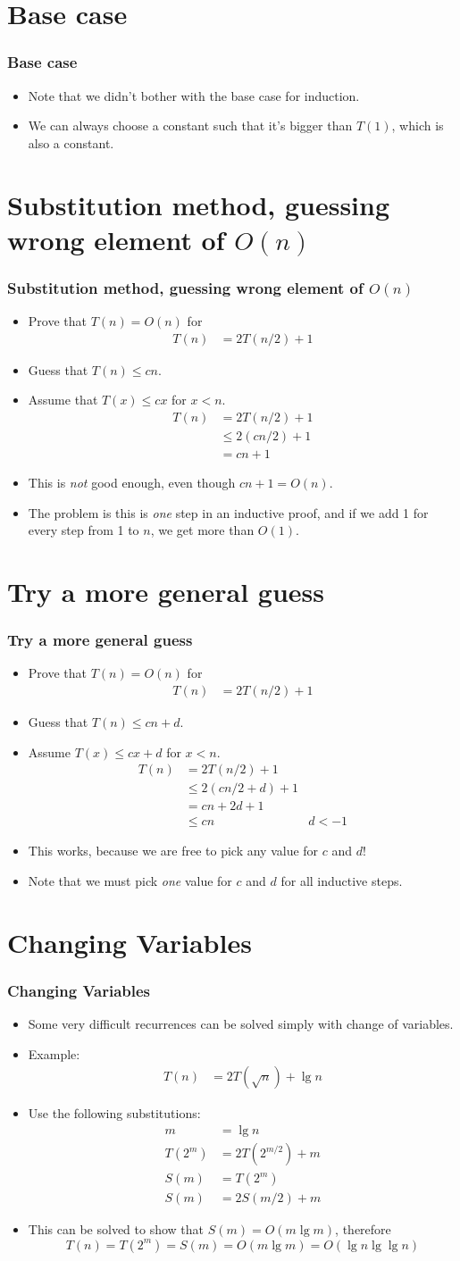 \documentclass{beamer}
\newcommand{\sect}[1]{
\section{#1}
\begin{frame}[fragile]\frametitle{#1}
}
\newcommand{\bi}{\begin{itemize}}
\newcommand{\ii}{\item}
\newcommand{\ei}{\end{itemize}}
\begin{document}
\sect{Base case}
\bi
\ii Note that we didn't bother with the base case for induction.
\ii We can always choose a constant such that it's bigger than $T(1)$,
which is also a constant.
\ei
\end{frame}

\sect{Substitution method, guessing wrong element of $O(n)$}
\bi
\ii
Prove that $T(n) = O(n)$ for
\begin{align*}
  T(n) &= 2T(n/2) + 1
\end{align*}
\ii
Guess that $T(n) \leq cn$.
\ii
Assume that $T(x) \leq cx$ for $x < n$.
\begin{align*}
  T(n) &= 2T(n/2) + 1 \\
       &\leq 2(cn/2) + 1\\
       &= cn + 1
\end{align*}
\ii
This is {\em not} good enough, even though $cn +1 = O(n)$.
\ii
The problem is this is {\em one} step in an inductive proof,
and if we add 1 for every step from 1 to $n$, we get more than $O(1)$.
\ei
\end{frame}
\sect{Try a more general guess}
\bi
\ii
Prove that $T(n) = O(n)$ for
\begin{align*}
  T(n) &= 2T(n/2) + 1
\end{align*}
\ii
Guess that $T(n) \leq cn + d$.
\ii
Assume $T(x) \leq cx + d$ for $x < n$.
\begin{align*}
  T(n) &= 2T(n/2) + 1 \\
       &\leq 2(cn/2 + d) + 1\\
       &= cn + 2d + 1\\
       &\leq cn  & d < -1
\end{align*}
\ii
This works, because we are free to pick any value for $c$ and $d$!
\ii
Note that we must pick {\em one} value for $c$ and $d$ for
all inductive steps.  
\ei
\end{frame}

\sect{Changing Variables}
\bi
\ii
Some very difficult recurrences can be solved simply
with change of variables.
\ii Example:
\begin{align*}
  T(n) &= 2T(\sqrt{n}) + \lg n
\end{align*}
\ii
Use the following substitutions:
\begin{align*}
  m &= \lg n\\
  T(2^m) &= 2T(2^{m/2}) + m\\
  S(m) &= T(2^m)\\
  S(m) &= 2S(m/2) + m
\end{align*}
\ii
This can be solved to show that $S(m) =O(m\lg m)$, therefore
\[
T(n) = T(2^m) = S(m) =O(m \lg m) = O(\lg n \lg \lg n)
\]
\ei
\end{frame}
\end{document}
